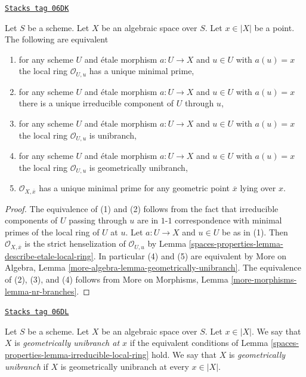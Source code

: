 \begin{lemma}
\label{spaces-properties-lemma-irreducible-local-ring}
\href{https://stacks.math.columbia.edu/tag/06DK}{\texttt{Stacks tag 06DK}}

Let $S$ be a scheme.
Let $X$ be an algebraic space over $S$.
Let $x \in |X|$ be a point.
The following are equivalent
\begin{enumerate}
\item for any scheme $U$ and \'etale morphism $a : U \to X$ and
$u \in U$ with $a(u) = x$ the local ring $\mathcal{O}_{U, u}$ has a
unique minimal prime,
\item for any scheme $U$ and \'etale morphism $a : U \to X$ and
$u \in U$ with $a(u) = x$ there is a unique irreducible component of $U$
through $u$,
\item for any scheme $U$ and \'etale morphism $a : U \to X$ and
$u \in U$ with $a(u) = x$ the local ring $\mathcal{O}_{U, u}$
is unibranch,
\item for any scheme $U$ and \'etale morphism $a : U \to X$ and
$u \in U$ with $a(u) = x$ the local ring $\mathcal{O}_{U, u}$
is geometrically unibranch,
\item $\mathcal{O}_{X, \overline{x}}$ has a unique minimal prime
for any geometric point $\overline{x}$ lying over $x$.
\end{enumerate}
\end{lemma}

\begin{proof}
The equivalence of (1) and (2) follows from the fact that irreducible
components of $U$ passing through $u$ are in $1$-$1$ correspondence with
minimal primes of the local ring of $U$ at $u$. Let $a : U \to X$ and
$u \in U$ be as in (1). Then $\mathcal{O}_{X, \overline{x}}$ is
the strict henselization of $\mathcal{O}_{U, u}$ by
Lemma \ref{spaces-properties-lemma-describe-etale-local-ring}.
In particular (4) and (5) are equivalent by
More on Algebra, Lemma \ref{more-algebra-lemma-geometrically-unibranch}.
The equivalence of (2), (3), and (4) follows from
More on Morphisms, Lemma \ref{more-morphisms-lemma-nr-branches}.
\end{proof}

\begin{definition}[Unibranch]
\label{spaces-properties-definition-unibranch}
\href{https://stacks.math.columbia.edu/tag/06DL}{\texttt{Stacks tag 06DL}}

Let $S$ be a scheme. Let $X$ be an algebraic space over $S$.
Let $x \in |X|$. We say that $X$ is {\it geometrically unibranch
at $x$} if the equivalent conditions of
Lemma \ref{spaces-properties-lemma-irreducible-local-ring}
hold. We say that $X$ is {\it geometrically unibranch} if $X$ is
geometrically unibranch at every $x \in |X|$.
\end{definition}

